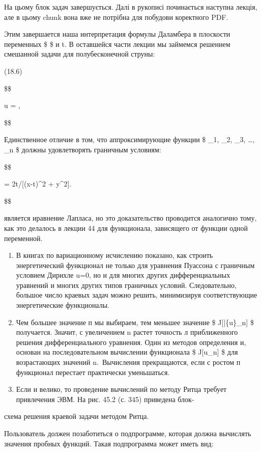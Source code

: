 \documentclass[
  ukrainian,
]{article}
\begin{document}
На цьому блок задач завершується. Далі в рукописі починається наступна
лекція, але в цьому chunk вона вже не потрібна для побудови коректного
PDF.

Этим завершается наша интерпретация формулы Даламбера в плоскости
переменных \$  \$ и t. В оставшейся части лекции мы
займемся решением смешанной задачи для полубесконечной струны:

(18.6)

\$\$

u = \gamma [(x-s)(x-t)-\gamma^2],

\$\$

Единственное отличие в том, что аппроксимирующие функции \$ \phi\_1,
\phi\_2, \phi\_3, \ldots, \phi\_n \$ должны удовлетворять граничным
условиям:

\$\$

\gamma = 2t/{[}(x-t)\^{}2 + y\^{}2{]}.

\$\$

является иравнение Лапласа, но это доказательство проводится аналогично
тому, как это делалось в лекции 44 для функционала, зависящего от
функции одной переменной.

\begin{enumerate}
\def\labelenumi{\arabic{enumi}.}
\setcounter{enumi}{2}
\item
  В книгах по вариационному исчислению показано, как строить
  энергетический функционал не только для уравнения Пуассона с граничным
  условием Дирихле u=0, но и для многих других дифференциальных
  уравнений и многих других типов граничных условий. Следовательно,
  большое число краевых задач можно решить, минимизируя соответствующие
  энергетические функционалы.
\item
  Чем большее значение п мы выбираем, тем меньшее значение \$
  J{[}\bar\{u\}\_n{]} \$ получается. Значит, с увеличением n растет
  точность л приближенного решения дифференциального уравнения. Один из
  методов определения и, основан на последовательном вычислении
  функционала \$ J{[}u\_n{]} \$ для возрастающих значений n.~Вычисления
  прекращаются, если с ростом п функционал перестает практически
  уменьшаться.
\item
  Если и велико, то проведение вычислений по методу Ритца требует
  привлечения ЭВМ. На рис. 45.2 (с. 345) приведена блок-
\end{enumerate}

схема решения краевой задачи методом Ритца.

Пользователь должен позаботиться о подпрограмме, которая должна
вычислять значения пробных функций. Такая подпрограмма может иметь вид:
\end{document}
